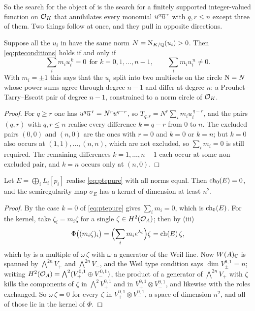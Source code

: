 So the search for the object of  is the search for a
finitely supported integer-valued function on $\mathcal{O}_{K}$ that annihilates every
monomial $u^{q}\overline{u}^{\,r}$ with $q,r\le n$ except three of them. Two things
follow at once, and they pull in opposite directions.

\begin{lemma}
\label{lem:pte}
Suppose all the $u_{i}$ in  have the same norm
$N=\mathrm{N}_{K/\mathbb{Q}}(u_{i})>0$. Then \eqref{eq:pteconditions} holds if and only if
\begin{equation}\label{eq:ptepure}
  \sum_{i}m_{i}u_{i}^{\,k}=0\ \ \text{for } k=0,1,\dots,n-1,
  \qquad
  \sum_{i}m_{i}u_{i}^{\,n}\ne0 .
\end{equation}
With $m_{i}=\pm1$ this says that the $u_{i}$ split into two multisets on the
circle $\mathrm{N}=N$ whose power sums agree through degree $n-1$ and differ at
degree $n$: a Prouhet--Tarry--Escott pair of degree $n-1$, constrained to a
norm circle of $\mathcal{O}_{K}$.
\end{lemma}

\begin{proof}
For $q\ge r$ one has $u^{q}\overline{u}^{\,r}=N^{r}u^{q-r}$, so
$T_{q,r}=N^{r}\sum_{i}m_{i}u_{i}^{\,q-r}$, and the pairs $(q,r)$ with
$q,r\le n$ realise every difference $k=q-r$ from $0$ to $n$. The excluded
pairs $(0,0)$ and $(n,0)$ are the ones with $r=0$ and $k=0$ or $k=n$; but
$k=0$ also occurs at $(1,1),\dots,(n,n)$, which are not excluded, so
$\sum_{i}m_{i}=0$ is still required. The remaining differences
$k=1,\dots,n-1$ each occur at some non-excluded pair, and $k=n$ occurs only at
$(n,0)$.
\end{proof}

\begin{theorem}\label{thm:equalnorms}
Let $E=\bigoplus_{i}L_{i}[p_{i}]$ realise \eqref{eq:ptepure} with all norms
equal. Then $\operatorname{ch}_{0}(E)=0$, and the semiregularity map $\sigma_{E}$ has a
kernel of dimension at least $n^{2}$.
\end{theorem}

\begin{proof}
By  the case $k=0$ of \eqref{eq:ptepure} gives
$\sum_{i}m_{i}=0$, which is $\operatorname{ch}_{0}(E)$. For the kernel, take
$\zeta_{i}=m_{i}\zeta$ for a single $\zeta\in H^{2}(\mathcal{O}_{A})$; then by
(iii)
\[
  \Phi\bigl((m_{i}\zeta)_{i}\bigr)
  =\Bigl(\sum_{i}m_{i}e^{\lambda_{i}}\Bigr)\zeta=\operatorname{ch}(E)\,\zeta ,
\]
which by  is a multiple of $\omega\,\zeta$ with
$\omega$ a generator of the Weil line. Now $W(A)_{\mathbb{C}}$ is spanned by
$\bigwedge^{2n}V_{+}$ and $\bigwedge^{2n}V_{-}$, and the Weil type condition
says $\dim V_{\pm}^{0,1}=n$; writing
$H^{2}(\mathcal{O}_{A})=\bigwedge^{2}(V_{+}^{0,1}\oplus V_{-}^{0,1})$, the product of
a generator of $\bigwedge^{2n}V_{+}$ with $\zeta$ kills the components of
$\zeta$ in $\bigwedge^{2}V_{+}^{0,1}$ and in
$V_{+}^{0,1}\otimes V_{-}^{0,1}$, and likewise with the roles exchanged. So
$\omega\,\zeta=0$ for every $\zeta$ in
$V_{+}^{0,1}\otimes V_{-}^{0,1}$, a space of dimension $n^{2}$, and all of
those lie in the kernel of $\Phi$.
\end{proof}

